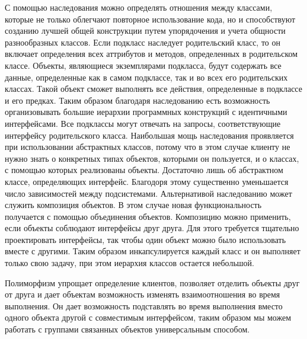 \documentclass[russian,utf8,simple,hpadding=10mm,vpadding=20mm]{eskdtext}
\begin{document}
С помощью наследования можно определять отношения между классами, которые не только облегчают повторное использование кода, но и способствуют созданию лучшей общей конструкции путем упорядочения и учета общности разнообразных классов.
Если подкласс наследует родительский класс, то он включает определения всех
аттрибутов и методов, определенных в родительском классе. Объекты, являющиеся экземплярами подкласса, будут содержать все данные, определенные как в самом подклассе, так и во всех его родительских классах. Такой объект сможет выполнять все действия, определенные в подклассе и его предках. Таким образом благодаря наследованию есть возможность организовывать большие иерархии программных конструкций с идентичными интерфейсами. Все
подклассы могут отвечать на запросы, соответствующие интерфейсу родительского класса. Наибольшая мощь наследования проявляется при использовании абстрактных классов, потому что в этом случае клиенту не нужно знать о конкретных типах объектов, которыми он пользуется,  и о классах, с помощью которых реализованы объекты. Достаточно лишь об абстрактном классе, определяющих интерфейс. Благодоря этому существенно уменьшается число зависимостей между подсистемами. Альтернативой наследованию может служить композиция объектов. В этом случае новая функциональность получается с помощью объединения объектов. Композицию можно применить, если объекты соблюдают интерфейсы друг друга. Для этого требуется тщательно проектировать интерфейсы, так чтобы один объект можно было использовать вместе с другими. Таким образом инкапсулируется каждый класс и он выполняет только свою задачу, при этом иерархия классов остается небольшой.

Полиморфизм упрощает определение клиентов, позволяет отделить объекты друг от друга и дает объектам возможность изменять взаимоотношения во время выполнения. Он дает возможность подставлять во время выполнения вместо одного объекта другой с совместимым интерфейсом, таким образом мы можем работать с группами связанных объектов универсальным способом.

\newpage
\parindent=15mm
\doublespacing
\end{document}
